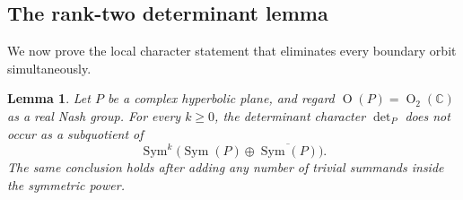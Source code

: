 \documentclass[11pt,reqno]{amsart}
\numberwithin{equation}{section}
\newtheorem{lemma}[theorem]{Lemma}
\theoremstyle{definition}
\theoremstyle{remark}
\newcommand{\C}{\mathbb C}
\newcommand{\Or}{\operatorname{O}}
\newcommand{\Sym}{\operatorname{Sym}}
\begin{document}
\subsection{The rank-two determinant lemma}\label{spin:sec:detlemma}

We now prove the local character statement that eliminates every boundary
orbit simultaneously.

\begin{lemma}\label{spin:lem:det-ranktwo}
Let $P$ be a complex hyperbolic plane, and regard $\Or(P)=\Or_2(\C)$ as a real
Nash group.  For every $k\ge0$, the determinant character $\det_P$ does not
occur as a subquotient of
\begin{equation}\label{spin:eq:det-ranktwo-module}
  \Sym^k\bigl(\Sym(P)\oplus\overline{\Sym(P)}\bigr).
\end{equation}
The same conclusion holds after adding any number of trivial summands inside
the symmetric power.
\end{lemma}
\end{document}
